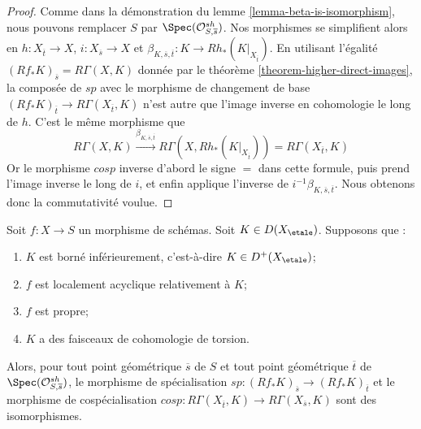 \begin{proof}
Comme dans la démonstration du lemme \ref{lemma-beta-is-isomorphism},
nous pouvons remplacer $S$ par $\Spec(\mathcal{O}^{sh}_{S, \overline{s}})$.
Nos morphismes se simplifient alors en $h : X_{\overline{t}} \to X$,
$i : X_{\overline{s}} \to X$ et
$\beta_{K, \overline{s}, \overline{t}} : K \to Rh_*(K|_{X_{\overline{t}}})$.
En utilisant l'égalité $(Rf_*K)_{\overline{s}} = R\Gamma(X, K)$ donnée par le
théorème \ref{theorem-higher-direct-images},
la composée de $sp$ avec le morphisme de changement de base
$(Rf_*K)_{\overline{t}} \to R\Gamma(X_{\overline{t}}, K)$
n'est autre que l'image inverse en cohomologie le long de $h$.
C'est le même morphisme que
$$
R\Gamma(X, K) \xrightarrow{\beta_{K, \overline{s}, \overline{t}}}
R\Gamma(X, Rh_*(K|_{X_{\overline{t}}})) =
R\Gamma(X_{\overline{t}}, K)
$$
Or le morphisme $cosp$ inverse d'abord le signe $=$ dans cette
formule, puis prend l'image inverse le long de $i$, et enfin applique
l'inverse de $i^{-1}\beta_{K, \overline{s}, \overline{t}}$.
Nous obtenons donc la commutativité voulue.
\end{proof}

\begin{lemma}
\label{lemma-sp-isom-proper-torsion-loc-ac}
Soit $f : X \to S$ un morphisme de schémas. Soit $K \in D(X_\etale)$.
Supposons que :
\begin{enumerate}
\item $K$ est borné inférieurement, c'est-à-dire $K \in D^+(X_\etale)$;
\item $f$ est localement acyclique relativement à $K$;
\item $f$ est propre;
\item $K$ a des faisceaux de cohomologie de torsion.
\end{enumerate}
Alors, pour tout point géométrique $\overline{s}$ de $S$ et tout point
géométrique $\overline{t}$ de $\Spec(\mathcal{O}^{sh}_{S, \overline{s}})$,
le morphisme de spécialisation
$sp : (Rf_*K)_{\overline{s}} \to (Rf_*K)_{\overline{t}}$
et le morphisme de cospécialisation
$cosp : R\Gamma(X_{\overline{t}}, K) \to R\Gamma(X_{\overline{s}}, K)$
sont des isomorphismes.
\end{lemma}

